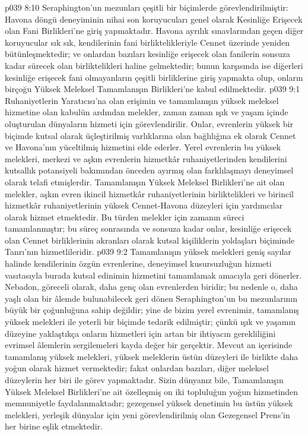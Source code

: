 \vs p039 8:10 Seraphington’un mezunları çeşitli bir biçimlerde görevlendirilmiştir: Havona döngü deneyiminin nihai son koruyucuları genel olarak Kesinliğe Erişecek olan Fani Birlikleri’ne giriş yapmaktadır. Havona ayrılık sınavlarından geçen diğer koruyucular sık sık, kendilerinin fani birliktelikleriyle Cennet üzerinde yeniden bütünleşmektedir; ve onlardan bazıları kesinliğe erişecek olan fanilerin sonsuza kadar sürecek olan birliktelikleri haline gelmektedir; bunun karşısında ise diğerleri kesinliğe erişecek fani olmayanların çeşitli birliklerine giriş yapmakta olup, onların birçoğu Yüksek Meleksel Tamamlanışın Birlikleri’ne kabul edilmektedir.
\vs p039 9:1 Ruhaniyetlerin Yaratıcısı’na olan erişimin ve tamamlanışın yüksek meleksel hizmetine olan kabulün ardından melekler, zaman zaman ışık ve yaşam içinde oluşturulan dünyaların hizmeti için görevlendirilir. Onlar, evrenlerin yüksek bir biçimde kutsal olarak üçleştirilmiş varlıklarına olan bağlılığına ek olarak Cennet ve Havona’nın yüceltilmiş hizmetini elde ederler. Yerel evrenlerin bu yüksek melekleri, merkezi ve aşkın evrenlerin hizmetkâr ruhaniyetlerinden kendilerini kutsallık potansiyeli bakımından önceden ayırmış olan farklılaşmayı deneyimsel olarak telafi etmişlerdir. Tamamlanışın Yüksek Meleksel Birlikleri’ne ait olan melekler, aşkın evren ikincil hizmetkâr ruhaniyetlerinin birliktelikleri ve birincil hizmetkâr ruhaniyetlerinin yüksek Cennet\hyp{}Havona düzeyleri için yardımcılar olarak hizmet etmektedir. Bu türden melekler için zamanın süreci tamamlanmıştır; bu süreç sonrasında ve sonsuza kadar onlar, kesinliğe erişecek olan Cennet birliklerinin akranları olarak kutsal kişiliklerin yoldaşları biçiminde Tanrı’nın hizmetlileridir.
\vs p039 9:2 Tamamlanışın yüksek melekleri geniş sayılar halinde kendilerinin özgün evrenlerine, deneyimsel kusursuzluğun hizmeti vasıtasıyla burada kutsal edinimin hizmetini tamamlamak amacıyla geri dönerler. Nebadon, göreceli olarak, daha genç olan evrenlerden biridir; bu nedenle o, daha yaşlı olan bir âlemde bulunabilecek geri dönen Seraphington’un bu mezunlarının büyük bir çoğunluğuna sahip değildir; yine de bizim yerel evrenimiz, tamamlanış yüksek melekleri ile yeterli bir biçimde tedarik edilmiştir; çünkü ışık ve yaşamın düzeyine yaklaştıkça onların hizmetleri için artan bir ihtiyacın gerekliliğini evrimsel âlemlerin sergilemeleri kayda değer bir gerçektir. Mevcut an içerisinde tamamlanış yüksek melekleri, yüksek meleklerin üstün düzeyleri ile birlikte daha yoğun olarak hizmet vermektedir; fakat onlardan bazıları, diğer meleksel düzeylerin her biri ile görev yapmaktadır. Sizin dünyanız bile, Tamamlanışın Yüksek Meleksel Birlikleri’ne ait özelleşmiş on iki topluluğun yoğun hizmetinden memnuniyetle faydalanmaktadır; gezegensel yüksek denetimin bu üstün yüksek melekleri, yerleşik dünyalar için yeni görevlendirilmiş olan Gezegensel Prens’in her birine eşlik etmektedir.
